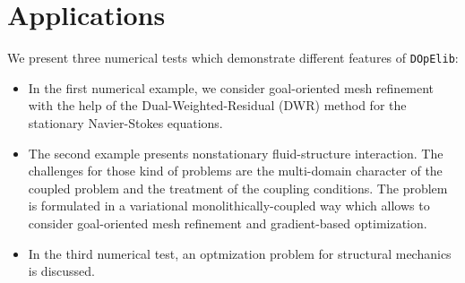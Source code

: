 \documentclass[prodmode,acmtoms]{acmsmall}
\numberwithin{equation}{section}
\newcommand{\deal}{\texttt{deal.II}}
\newcommand{\dope}{\texttt{DOpElib}}
\newcommand{\todo}[1]{\textbf{\textsc{\textcolor{black}{TODO: #1}}}}
\begin{document}
%
%
%
%
%
%
%
\section{Applications}
\label{applications}
We present three numerical tests which demonstrate different
features of \dope{}:
\begin{itemize}
\item In the first numerical example, we consider 
goal-oriented mesh refinement with the help of the 
Dual-Weighted-Residual (DWR) method for the stationary Navier-Stokes equations.
\item The second example presents nonstationary fluid-structure 
interaction. The challenges for those kind of problems are the multi-domain
character of the coupled problem and the treatment of the coupling conditions.
The problem is formulated in a variational monolithically-coupled way which 
allows to consider goal-oriented mesh refinement and gradient-based optimization.
\item In the third numerical test, an optmization problem for structural mechanics
is discussed.
\end{itemize}
\end{document}
